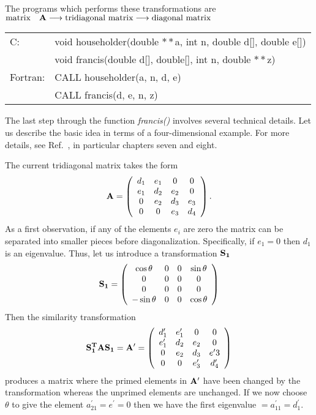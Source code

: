 The programs  which performs these transformations are
$\mbox{matrix} \quad {\bf A} \longrightarrow \mbox{tridiagonal matrix}
 \longrightarrow \mbox{diagonal matrix}$
\begin{svgraybox}
\begin{center} 
\begin{tabular}{ll}
%
C: &void householder(double $**$a, int n, double d[], double e[])\\
   &void francis(double d[], double[], int n, double $**$z)\\
Fortran:  &CALL householder(a, n, d, e)\\
          &CALL francis(d, e, n, z)
\end{tabular}
\end{center}
\end{svgraybox}
The last step through the function {\sl francis()} involves several technical details. Let
us describe the basic idea in terms of a four-dimensional example.
For more details, see Ref.~\cite{golub1996}, in particular chapters seven 
and eight.
 
The current tridiagonal matrix takes the form
%
\[
 {\bf A} =
      \left( \begin{array}{cccc} 
                d_{1} & e_{1} & 0     &  0    \\
                e_{1} & d_{2} & e_{2} &  0    \\
                 0    & e_{2} & d_{3} & e_{3} \\
                 0    &   0   & e_{3} & d_{4} 
             \end{array} \right).
\]
%
As a first observation, if any of the elements $e_{i}$ are zero the
matrix can be separated into smaller pieces before
diagonalization. Specifically, if $e_{1} = 0$ then $d_{1}$ is an
eigenvalue. Thus, let us introduce  a transformation ${\bf S_{1}}$
%
\[
 {\bf S_{1}} =
      \left( \begin{array}{cccc} 
                \cos \theta & 0 & 0 & \sin \theta \\
                   0        & 0 & 0 &      0      \\
                   0        & 0 & 0 &      0      \\
               -\sin \theta & 0 & 0 & \cos \theta 
             \end{array} \right)
\]
%
Then the similarity transformation 
%
\[
{\bf S_{1}^{T} A  S_{1}} = {\bf A'} = 
      \left( \begin{array}{cccc}
              d'_{1} & e'_{1} &   0    &   0   \\
              e'_{1}  & d_{2}  & e_{2}  &   0   \\
                0    & e_{2}  & d_{3}  & e'{3} \\
                0    &   0    & e'_{3} & d'_{4}
             \end{array} \right)
\]
%
produces a matrix where the primed elements in ${\bf A'}$ have been
changed by the transformation whereas the unprimed elements are unchanged.
If we now choose $\theta$ to
give the element $a_{21}^{'} = e^{'}= 0$ then we have the first
eigenvalue  $= a_{11}^{'} = d_{1}^{'}$.

